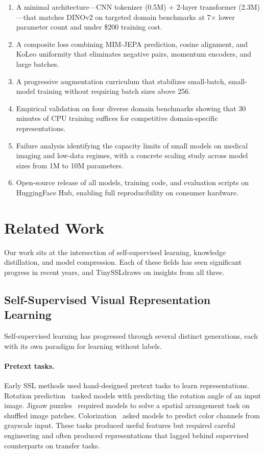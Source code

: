 \documentclass{article}
\newcommand{\method}{TinySSL}
\begin{document}
\begin{enumerate}
    \item A minimal architecture---CNN tokenizer (0.5M) + 2-layer transformer (2.3M)---that matches DINOv2 on targeted domain benchmarks at 7$\times$ lower parameter count and under \$200 training cost.
    \item A composite loss combining MIM-JEPA prediction, cosine alignment, and KoLeo uniformity that eliminates negative pairs, momentum encoders, and large batches.
    \item A progressive augmentation curriculum that stabilizes small-batch, small-model training without requiring batch sizes above 256.
    \item Empirical validation on four diverse domain benchmarks showing that 30 minutes of CPU training suffices for competitive domain-specific representations.
    \item Failure analysis identifying the capacity limits of small models on medical imaging and low-data regimes, with a concrete scaling study across model sizes from 1M to 10M parameters.
    \item Open-source release of all models, training code, and evaluation scripts on HuggingFace Hub, enabling full reproducibility on consumer hardware.
\end{enumerate}

\section{Related Work}
\label{sec:related}

Our work sits at the intersection of self-supervised learning, knowledge distillation, and model compression. Each of these fields has seen significant progress in recent years, and \method draws on insights from all three.

\subsection{Self-Supervised Visual Representation Learning}

Self-supervised learning has progressed through several distinct generations, each with its own paradigm for learning without labels.

\paragraph{Pretext tasks.} Early SSL methods used hand-designed pretext tasks to learn representations. Rotation prediction~\cite{rotnet} tasked models with predicting the rotation angle of an input image. Jigsaw puzzles~\cite{jigsaw} required models to solve a spatial arrangement task on shuffled image patches. Colorization~\cite{colorization} asked models to predict color channels from grayscale input. These tasks produced useful features but required careful engineering and often produced representations that lagged behind supervised counterparts on transfer tasks.
\end{document}
